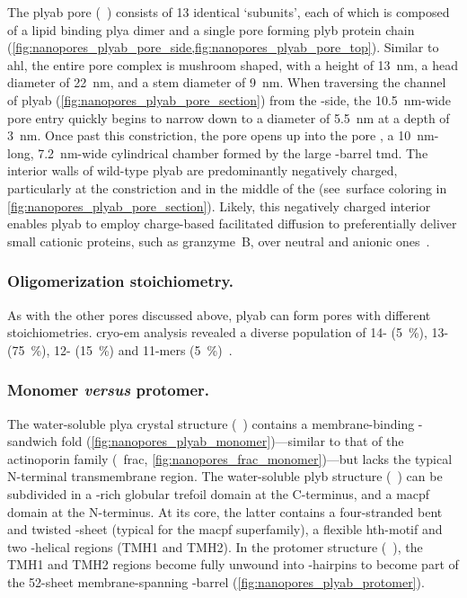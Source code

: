 The \gls{plyab} pore (~\cite{Lukoyanova-Kondos-2015}) consists of 13 identical `subunits', each of
which is composed of a lipid binding \gls{plya} dimer and a single pore forming \gls{plyb} protein chain
(\cref{fig:nanopores_plyab_pore_side,fig:nanopores_plyab_pore_top}). Similar to \gls{ahl}, the entire pore
complex is mushroom shaped, with a height of \SI{13}{\nm}, a head diameter of \SI{22}{\nm}, and a stem
diameter of \SI{9}{\nm}. When traversing the channel of \gls{plyab} (\cref{fig:nanopores_plyab_pore_section})
from the \cisi{}-side, the \SI{10.5}{\nm}-wide pore entry quickly begins to narrow down to a diameter of
\SI{5.5}{\nm} at a depth of \SI{3}{\nm}. Once past this constriction, the pore opens up into the pore
\lumen{}, a \SI{10}{\nm}-long, \SI{7.2}{\nm}-wide cylindrical chamber formed by the large \tb-barrel
\gls{tmd}. The interior walls of wild-type \gls{plyab} are predominantly negatively charged, particularly at
the constriction and in the middle of the \lumen{} (see~surface coloring in
\cref{fig:nanopores_plyab_pore_section}). Likely, this negatively charged interior enables \gls{plyab} to
employ charge-based facilitated diffusion to preferentially deliver small cationic proteins, such as
granzyme~B, over neutral and anionic ones~\cite{Stewart-2014,Reboul-2016}.


\subsubsection{Oligomerization stoichiometry.}
%

As with the other pores discussed above, \gls{plyab} can form pores with different stoichiometries.
\Gls{cryo-em} analysis revealed a diverse population of 14- (\SI{5}{\percent}), 13- (\SI{75}{\percent}), 12-
(\SI{15}{\percent}) and 11-mers (\SI{5}{\percent})~\cite{Lukoyanova-Kondos-2015}.


\subsubsection{Monomer \textit{versus} protomer.}
%

The water-soluble \gls{plya} crystal structure (~\cite{Lukoyanova-Kondos-2015}) contains a
membrane-binding \tb-sandwich fold (\cref{fig:nanopores_plyab_monomer})---similar to that of the actinoporin
family (\eg~\gls{frac}, \cref{fig:nanopores_frac_monomer})---but lacks the typical N-terminal transmembrane
region. The water-soluble \gls{plyb} structure (~\cite{Lukoyanova-Kondos-2015}) can be subdivided
in a \tb-rich globular trefoil domain at the C-terminus, and a \gls{macpf} domain at the N-terminus. At its
core, the latter contains a four-stranded bent and twisted \tb-sheet (typical for the \gls{macpf}
superfamily), a flexible \gls{hth}-motif and two \ta-helical regions ({TMH1} and {TMH2}). In the protomer
structure (~\cite{Lukoyanova-Kondos-2015}), the {TMH1} and {TMH2} regions become fully unwound
into \tb-hairpins to become part of the 52-sheet membrane-spanning \tb-barrel
(\cref{fig:nanopores_plyab_protomer}).


